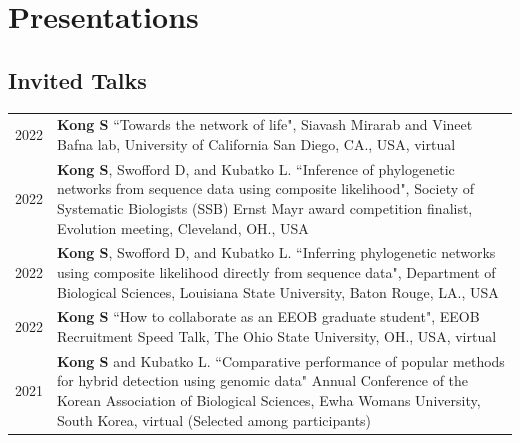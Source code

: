 \documentclass[11pt]{article}
\begin{document}











\section*{Presentations}

\subsection*{Invited Talks}

\begin{longtable}{p{}  p{}}


2022 & \textbf{Kong S} ``Towards the network of life",  Siavash Mirarab and Vineet Bafna lab, University of California San Diego, CA., USA, virtual\vspace{5pt}\\

2022 & \textbf{Kong S}, Swofford D, and Kubatko L. ``Inference of phylogenetic networks from sequence data using composite likelihood",  Society of Systematic Biologists (SSB) Ernst Mayr award competition finalist, Evolution meeting, Cleveland, OH., USA\vspace{5pt}\\

2022 & \textbf{Kong S}, Swofford D, and Kubatko L. ``Inferring phylogenetic networks using composite likelihood directly from sequence data", Department of Biological Sciences, Louisiana State University, Baton Rouge, LA., USA\vspace{5pt}\\

2022 & \textbf{Kong S} ``How to collaborate as an EEOB graduate student", EEOB Recruitment Speed Talk, The Ohio State University, OH., USA, virtual \vspace{5pt} \\ 

2021 & \textbf{Kong S} and Kubatko L.  ``Comparative performance of popular methods for hybrid detection using genomic data" Annual Conference of the Korean Association of Biological Sciences, Ewha Womans University, South Korea, virtual (Selected among participants)\vspace{5pt}\\


\end{longtable}
\end{document}
